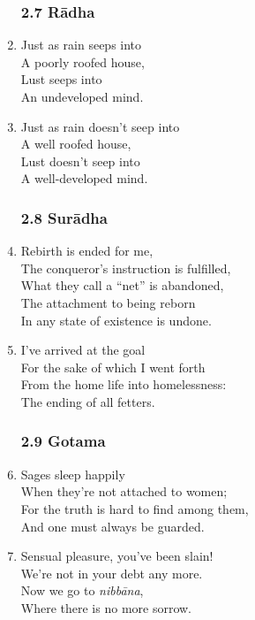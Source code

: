 \documentclass[10pt, openany]{book}
\begin{document}
\begin{enumerate}
\subsubsection*{2.7 Rādha}

\item Just as rain seeps into\\
A poorly roofed house,\\
Lust seeps into\\
An undeveloped mind.

\item Just as rain doesn’t seep into\\
A well roofed house,\\
Lust doesn’t seep into\\
A well-developed mind.

\subsubsection*{2.8 Surādha}

\item Rebirth is ended for me,\\
The conqueror’s instruction is fulfilled,\\
What they call a “net” is abandoned,\\
The attachment to being reborn \\
In any state of existence is undone.

\item I’ve arrived at the goal\\
For the sake of which I went forth\\
From the home life into homelessness:\\
The ending of all fetters.

\subsubsection*{2.9 Gotama}

\item Sages sleep happily\\
When they’re not attached to women;\\
For the truth is hard to find among them,\\
And one must always be guarded.

\item Sensual pleasure, you’ve been slain!\\
We’re not in your debt any more.\\
Now we go to \emph{nibbāna},\\
Where there is no more sorrow.


\end{enumerate}
\end{document}
